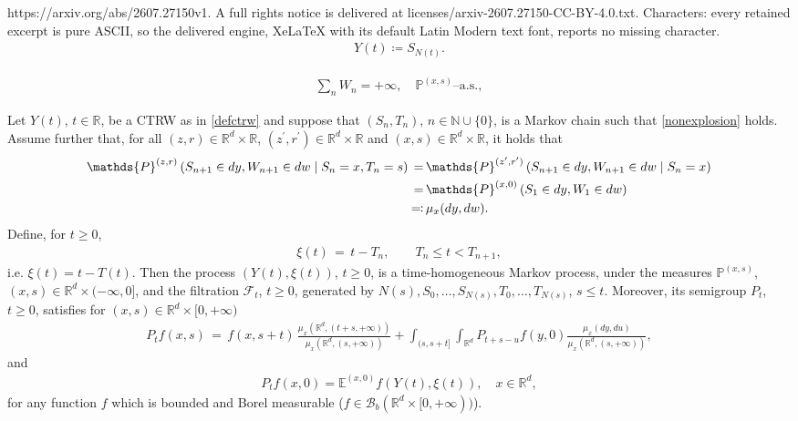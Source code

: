 \documentclass[10pt,a4paper]{amsart}
\newcommand{\NN}{\mathbb{N}}
\newcommand{\PP}{\mathds{P}}
\newcommand{\RR}{\mathbb{R}}
\begin{document}
https://arxiv.org/abs/2607.27150v1. A full rights notice is delivered at licenses/arxiv-2607.27150-CC-BY-4.0.txt. Characters: every retained excerpt is pure ASCII, so the delivered engine, XeLaTeX with its default Latin Modern text font, reports no missing character.
	\begin{align}
		Y(t) \coloneqq S_{N(t)}.
		\label{defctrw}
	\end{align}

	\begin{align}
		\sum_n W_n = +\infty, \quad \PP^{(x,s)}\text{--a.s.},
		\label{nonexplosion}
	\end{align}

	\begin{theorem}
		\label{thmGS}
		Let $Y(t)$, $t\in\RR$, be a CTRW as in \eqref{defctrw} and suppose that $(S_n, T_n)$, $n\in \NN \cup \{0\}$, is a Markov chain such that \eqref{nonexplosion} holds. Assume further that, for all $(z,r) \in \mathbb{R}^d \times \mathbb{R}$, $(z^\prime,r^\prime) \in \mathbb{R}^d \times \mathbb{R}$ and $(x,s) \in \mathbb{R}^d \times \mathbb{R}$, it holds that
		\begin{align}\label{semi-jump}
			\mathds{P}^{(z,r)} \left( S_{n+1} \in dy, W_{n+1} \in dw \mid S_n = x, T_n = s \right) \, = \, &\mathds{P}^{(z^\prime,r^\prime)} \left( S_{n+1} \in dy, W_{n+1} \in dw \mid S_n = x \right) \notag \\
			= \, & \mathds{P}^{(x,0)} \left( S_1 \in dy, W_1 \in dw \right) \notag  \\
			\eqqcolon \, & \mu_x(dy,dw).
		\end{align}
		Define, for $t \geq 0$,
		\begin{align}
			\xi(t) \, = \, t-T_n, \qquad T_n\leq t < T_{n+1},
		\end{align}
		i.e. $\xi(t) = t- T(t)$.
		Then the process $(Y(t), \xi (t))$, $t \geq 0$, is a time-homogeneous Markov process, under the measures $\PP^{(x,s)}$, $(x,s)\in \RR^d\times (-\infty,0]$, and the filtration $\mathcal{F}_t$, $t \geq 0$, generated by $N(s), S_0, \dots, S_{N(s)}, T_0, \dots, T_{N(s)}$, $s \le t$. Moreover, its semigroup $P_t$, $t \geq 0$, satisfies for $(x,s)\in \RR^d\times [0,+\infty)$
		\begin{align}
			P_tf(x,s) \, = \, f(x,s+t) \, \frac{\mu_x(\mathbb{R}^d, (t+s, +\infty))}{\mu_x(\mathbb{R}^d, (s, +\infty))} + \int_{(s,s+t]} \int_{\mathbb{R}^d} P_{t+s-u}f(y,0)   \frac{\mu_x(dy, du)}{\mu_x(\mathbb{R}^d, (s, +\infty))},
			\label{transition_step}
		\end{align}
		and 
		\begin{align}
			P_tf(x,0) = \mathds{E}^{(x,0)} f(Y(t), \xi(t)), \quad x\in \RR^d,
			\label{semizero}
		\end{align}
		for any function $f$ which is bounded and Borel measurable ($f \in \mathcal{B}_b (\mathbb{R}^d \times [0, +\infty))$).
	\end{theorem}
\end{document}
